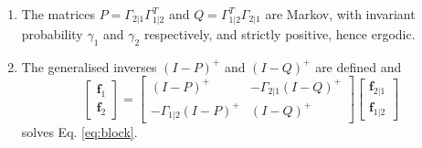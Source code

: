 \documentclass[runningheads]{llncs}
\begin{document}
\begin{proposition}
\begin{enumerate}
\item The matrices $P = \Gamma_{2|1}\Gamma_{1|2}^T$ and $Q = \Gamma_{1|2}^T\Gamma_{2|1}$ are Markov, with invariant probability $\gamma_1$ and $\gamma_2$ respectively, and strictly positive, hence ergodic.
\item The generalised inverses $(I-P)^+$ and $(I-Q)^+$ are defined and 
%
  \begin{equation*}
  \begin{bmatrix}
    \bm f_1 \\ \bm f_2
  \end{bmatrix}
=
    \begin{bmatrix}
      (I - P)^+ & - \Gamma_{2|1}(I - Q)^+ \\
- \Gamma_{1|2}(I-P)^+ & (I-Q)^+
    \end{bmatrix}
    \begin{bmatrix}
      \bm f_{2|1} \\ \bm f_{1|2}
    \end{bmatrix}
  \end{equation*}
%
solves Eq. \eqref{eq:block}.
\end{enumerate}
\end{proposition}
\end{document}
